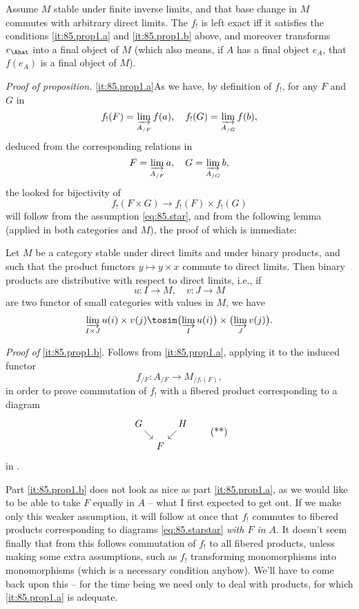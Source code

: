 \begin{corollary}
  Assume $M$ stable under finite inverse limits, and that base change
  in $M$ commutes with arbitrary direct limits. The $f_!$ is left
  exact if{f} it satisfies the conditions \textup{\ref{it:85.prop1.a}}
  and \textup{\ref{it:85.prop1.b}} above, and moreover transforms
  $e_\Ahat$ into a final object of $M$ \textup(which also means, if
  $A$ has a final object $e_A$, that $f(e_A)$ is a final object of
  $M$\textup).
\end{corollary}
\noindent\emph{Proof of proposition.}
\textup{\ref{it:85.prop1.a}}\enspace As we have, by definition of
$f_!$, for any $F$ and $G$ in \Ahat
\[f_!(F) = \varinjlim_{A_{/F}} f(a) ,\quad
f_!(G) = \varinjlim_{A_{/G}} f(b) ,\]
deduced from the corresponding relations in \Ahat
\[ F = \varinjlim_{A_{/F}} a , \quad
G = \varinjlim_{A_{/G}} b ,\]
the looked for bijectivity of
\[ f_!(F\times G) \to f_!(F)\times f_!(G)\]
will follow from the assumption \eqref{eq:85.star}, and from the
following lemma (applied in both categories \Ahat{} and $M$), the
proof of which is immediate:
\begin{lemma}
  Let $M$ be a category stable under direct limits and
  under binary products, and such that the product functors $y\mapsto
  y\times x$ commute to direct limits. Then binary products are
  distributive with respect to direct limits, i.e., if
  \[ u : I\to M, \quad v : J\to M\]
  are two functor of small categories with values in $M$, we have
  \[\varinjlim_{I\times J} u(i)\times v(j) \tosim \bigl( \varinjlim_I
  u(i) \bigr) \times \bigl( \varinjlim_J v(j) \bigr).\]
\end{lemma}

\emph{Proof of} \ref{it:85.prop1.b}. Follows from \ref{it:85.prop1.a},
applying it to the induced functor
\[ f_{/F} : A_{/F} \to M_{/f_!(F)},\]
in order to prove commutation of $f_!$ with a fibered product
corresponding to a diagram
\begin{equation}
  \label{eq:85.starstar}
  \begin{tikzcd}[column sep=tiny,row sep=small]
    G\ar[dr] & & H\ar[dl] \\ &  F &
  \end{tikzcd}\tag{**}
\end{equation}
in \Ahat.

\begin{remarknum}\label{rem:85.1}
  Part \ref{it:85.prop1.b} does not look as nice as part
  \ref{it:85.prop1.a}, as we would like to be able to take $F$ equally
  in $A$ -- what I first expected to get out. If we make only this
  weaker assumption, it will follow at once that $f_!$ commutes to
  fibered products corresponding to diagrams \eqref{eq:85.starstar}
  \emph{with $F$ in $A$}. It doesn't seem finally that from this
  follows commutation of $f_!$ to all fibered products, unless making
  some extra assumptions, such as $f_!$ transforming monomorphisms
  into monomorphisms (which is a necessary condition anyhow). We'll
  have to come back upon this -- for the time being we need only to
  deal with products, for which \ref{it:85.prop1.a} is adequate.
\end{remarknum}

